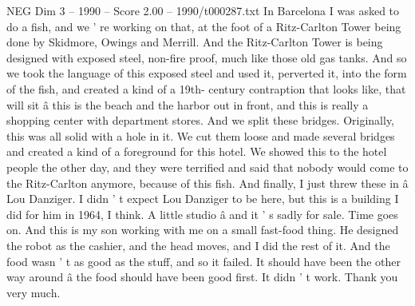 \begin{textsample}{NEG Dim 3 – 1990 – Score 2.00 – 1990/t000287.txt}
In Barcelona I was asked to do a fish, and we ' re working on that, at the foot of a Ritz-Carlton Tower being done by Skidmore, Owings and Merrill.
And the Ritz-Carlton Tower is being designed with exposed steel, non-fire proof, much like those old gas tanks.
And so we took the language of this exposed steel and used it, perverted it, into the form of the fish, and created a kind of a 19th- century contraption that looks like, that will sit â this is the beach and the harbor out in front, and this is really a shopping center with department stores.
And we split these bridges.
Originally, this was all solid with a hole in it.
We cut them loose and made several bridges and created a kind of a foreground for this hotel.
We showed this to the hotel people the other day, and they were terrified and said that nobody would come to the Ritz-Carlton anymore, because of this fish.
And finally, I just threw these in â Lou Danziger.
I didn ' t expect Lou Danziger to be here, but this is a building I did for him in 1964, I think.
A little studio â and it ' s sadly for sale.
Time goes on.
And this is my son working with me on a small fast-food thing.
He designed the robot as the cashier, and the head moves, and I did the rest of it.
And the food wasn ' t as good as the stuff, and so it failed.
It should have been the other way around â the food should have been good first.
It didn ' t work.
Thank you very much.

\end{textsample}
